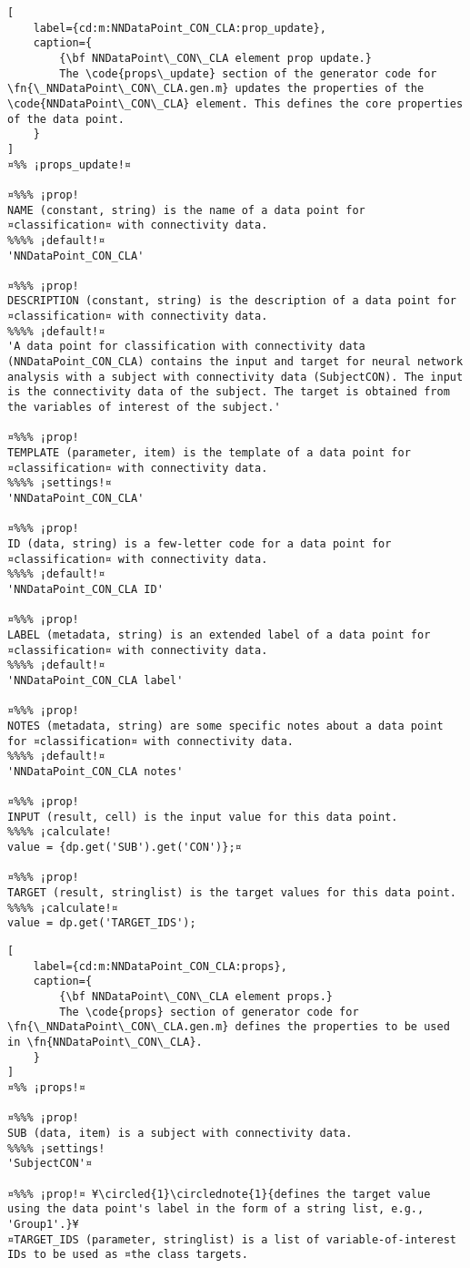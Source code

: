 \documentclass{tufte-handout}
\begin{document}
\begin{lstlisting}[
	label={cd:m:NNDataPoint_CON_CLA:prop_update},
	caption={
		{\bf NNDataPoint\_CON\_CLA element prop update.}
		The \code{props\_update} section of the generator code for \fn{\_NNDataPoint\_CON\_CLA.gen.m} updates the properties of the \code{NNDataPoint\_CON\_CLA} element. This defines the core properties of the data point.
	}
]
¤%% ¡props_update!¤

¤%%% ¡prop!
NAME (constant, string) is the name of a data point for ¤classification¤ with connectivity data.
%%%% ¡default!¤
'NNDataPoint_CON_CLA'

¤%%% ¡prop!
DESCRIPTION (constant, string) is the description of a data point for ¤classification¤ with connectivity data.
%%%% ¡default!¤
'A data point for classification with connectivity data (NNDataPoint_CON_CLA) contains the input and target for neural network analysis with a subject with connectivity data (SubjectCON). The input is the connectivity data of the subject. The target is obtained from the variables of interest of the subject.'

¤%%% ¡prop!
TEMPLATE (parameter, item) is the template of a data point for ¤classification¤ with connectivity data.
%%%% ¡settings!¤
'NNDataPoint_CON_CLA'

¤%%% ¡prop!
ID (data, string) is a few-letter code for a data point for ¤classification¤ with connectivity data.
%%%% ¡default!¤
'NNDataPoint_CON_CLA ID'

¤%%% ¡prop!
LABEL (metadata, string) is an extended label of a data point for ¤classification¤ with connectivity data.
%%%% ¡default!¤
'NNDataPoint_CON_CLA label'

¤%%% ¡prop!
NOTES (metadata, string) are some specific notes about a data point for ¤classification¤ with connectivity data.
%%%% ¡default!¤
'NNDataPoint_CON_CLA notes'

¤%%% ¡prop!
INPUT (result, cell) is the input value for this data point.
%%%% ¡calculate!
value = {dp.get('SUB').get('CON')};¤
    
¤%%% ¡prop!
TARGET (result, stringlist) is the target values for this data point.
%%%% ¡calculate!¤
value = dp.get('TARGET_IDS'); 

\end{lstlisting}

\begin{lstlisting}[
	label={cd:m:NNDataPoint_CON_CLA:props},
	caption={
		{\bf NNDataPoint\_CON\_CLA element props.}
		The \code{props} section of generator code for \fn{\_NNDataPoint\_CON\_CLA.gen.m} defines the properties to be used in \fn{NNDataPoint\_CON\_CLA}.
	}
]
¤%% ¡props!¤

¤%%% ¡prop!
SUB (data, item) is a subject with connectivity data.
%%%% ¡settings!
'SubjectCON'¤

¤%%% ¡prop!¤ ¥\circled{1}\circlednote{1}{defines the target value using the data point's label in the form of a string list, e.g., 'Group1'.}¥
¤TARGET_IDS (parameter, stringlist) is a list of variable-of-interest IDs to be used as ¤the class targets.

\end{lstlisting}
\end{document}
